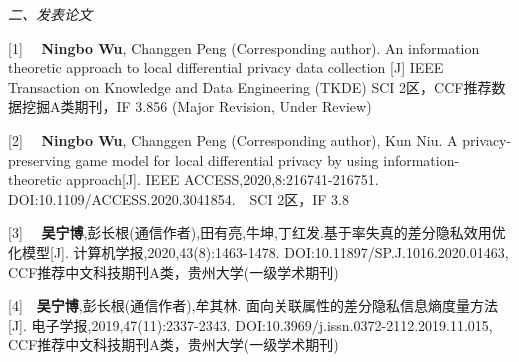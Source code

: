 \documentclass[pdftex,notypeinfo,twoside,openany,UTF8,fntef]{CASthesis}
\numberwithin{algorithm}{chapter}
\theoremstyle{THrm}{
	\newtheorem{question}{问题}[section]
    \newtheorem{problem}{问题}[section]
	\newtheorem{property}{性质}[section]
	\newtheorem{assumption}{假设}[section]
	\newtheorem{claim}[lemma]{断言}
}
\begin{document}
\begin{resumelist}{{\em 二、发表论文}}
	
[1] ~~\textbf{Ningbo Wu}, Changgen Peng (Corresponding author). An information theoretic approach to local differential privacy data collection [J] IEEE Transaction on Knowledge and Data Engineering (TKDE) SCI 2区，CCF推荐数据挖掘A类期刊，IF 3.856 (Major Revision, Under Review)

[2] ~~\textbf{Ningbo Wu}, Changgen Peng (Corresponding author), Kun Niu. A privacy-preserving game model for local differential privacy by using information-theoretic approach[J]. IEEE ACCESS,2020,8:216741-216751. DOI:10.1109/ACCESS.2020.3041854.~~SCI 2区，IF 3.8

[3] ~~\textbf{吴宁博},彭长根(通信作者),田有亮,牛坤,丁红发.基于率失真的差分隐私效用优化模型[J]. 计算机学报,2020,43(8):1463-1478. DOI:10.11897/SP.J.1016.2020.01463, CCF推荐中文科技期刊A类，贵州大学(一级学术期刊)

[4]~~\textbf{吴宁博},彭长根(通信作者),牟其林. 面向关联属性的差分隐私信息熵度量方法[J]. 电子学报,2019,47(11):2337-2343. DOI:10.3969/j.issn.0372-2112.2019.11.015, CCF推荐中文科技期刊A类，贵州大学(一级学术期刊)


\end{resumelist}
%
%
%
%
%
%
%
%
%
\end{document}

